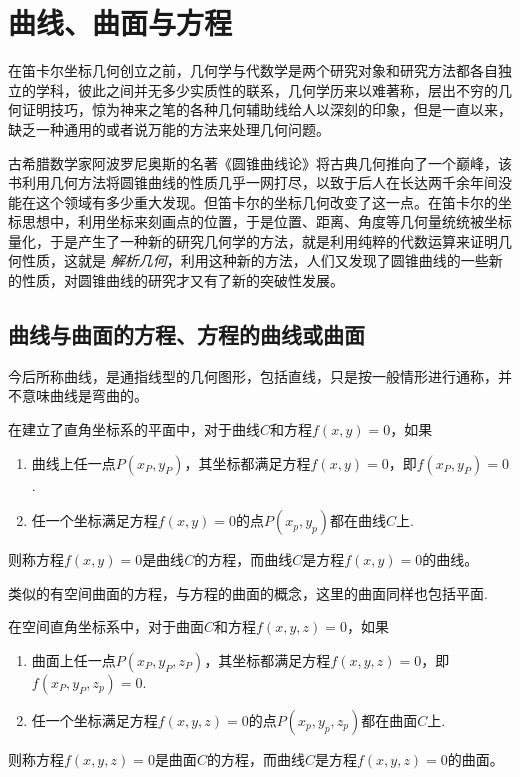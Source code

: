 
\section{曲线、曲面与方程}
\label{sec:curve-and-equation}

在笛卡尔坐标几何创立之前，几何学与代数学是两个研究对象和研究方法都各自独立的学科，彼此之间并无多少实质性的联系，几何学历来以难著称，层出不穷的几何证明技巧，惊为神来之笔的各种几何辅助线给人以深刻的印象，但是一直以来，缺乏一种通用的或者说万能的方法来处理几何问题。

古希腊数学家阿波罗尼奥斯的名著《圆锥曲线论》将古典几何推向了一个巅峰，该书利用几何方法将圆锥曲线的性质几乎一网打尽，以致于后人在长达两千余年间没能在这个领域有多少重大发现。但笛卡尔的坐标几何改变了这一点。在笛卡尔的坐标思想中，利用坐标来刻画点的位置，于是位置、距离、角度等几何量统统被坐标量化，于是产生了一种新的研究几何学的方法，就是利用纯粹的代数运算来证明几何性质，这就是 \emph{解析几何}，利用这种新的方法，人们又发现了圆锥曲线的一些新的性质，对圆锥曲线的研究才又有了新的突破性发展。

\subsection{曲线与曲面的方程、方程的曲线或曲面}
\label{sec:equation-of-curve-and-curve-of-equation}

今后所称曲线，是通指线型的几何图形，包括直线，只是按一般情形进行通称，并不意味曲线是弯曲的。

\begin{definition}
  在建立了直角坐标系的平面中，对于曲线$C$和方程$f(x,y)=0$，如果
  \begin{enumerate}
  \item 曲线上任一点$P(x_P,y_P)$，其坐标都满足方程$f(x,y)=0$，即$f(x_P,y_P)=0$.
  \item 任一个坐标满足方程$f(x,y)=0$的点$P(x_p,y_p)$都在曲线$C$上.
  \end{enumerate}
  则称方程$f(x,y)=0$是曲线$C$的方程，而曲线$C$是方程$f(x,y)=0$的曲线。
\end{definition}

类似的有空间曲面的方程，与方程的曲面的概念，这里的曲面同样也包括平面.

\begin{definition}
  在空间直角坐标系中，对于曲面$C$和方程$f(x,y,z)=0$，如果
  \begin{enumerate}
  \item 曲面上任一点$P(x_P,y_P,z_P)$，其坐标都满足方程$f(x,y,z)=0$，即$f(x_P,y_P,z_p)=0$.
  \item 任一个坐标满足方程$f(x,y,z)=0$的点$P(x_p,y_p,z_p)$都在曲面$C$上.
  \end{enumerate}
  则称方程$f(x,y,z)=0$是曲面$C$的方程，而曲线$C$是方程$f(x,y,z)=0$的曲面。
\end{definition}

